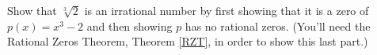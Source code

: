 {Show that $\sqrt[3]{2}$ is an irrational number by first showing that it is a zero of $p(x) = x^{3} - 2$ and then showing $p$ has no rational zeros.  (You'll need the Rational Zeros Theorem, Theorem \ref{RZT}, in order to show this last part.) \label{nthrootsareirrational}}
{}